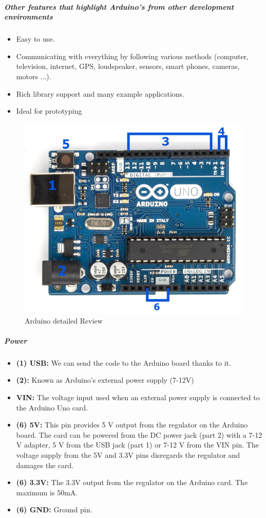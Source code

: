 \documentclass[11pt]{article}
\begin{document}
\vspace{0.1cm}
\subparagraph*{Other features that highlight Arduino’s from other development environments}
\begin{itemize}
\item Easy to use.
\item Communicating with everything by following various methods (computer, television, internet, GPS, loudspeaker, sensors, smart phones, cameras, motors ...).
\item Rich library support and many example applications.
\item Ideal for prototyping
\end{itemize}

\pagebreak

\begin{figure}[h]
\centering
\includegraphics[scale=0.25]{arduinoreview.png}
\caption{Arduino detailed Review}
\end{figure}

\subparagraph*{Power}
\begin{itemize}
\item[] \textbf{(1) USB:} We can send the code to the Arduino board thanks to it.
\item[] \textbf{(2):} Known as Arduino’s external power supply (7-12V)
\item[] \textbf{VIN:} The voltage input used when an external power supply is connected to the Arduino Uno card.
\item[] \textbf{(6) 5V:} This pin provides 5 V output from the regulator on the Arduino board. The card can be powered from the DC
power jack (part 2) with a 7-12 V adapter, 5 V from the USB jack (part 1) or 7-12 V from the VIN pin. The voltage supply from the 5V and 3.3V pins disregards the regulator and damages the card.
\item[] \textbf{(6) 3.3V:} The 3.3V output from the regulator on the Arduino card. The maximum is 50mA.
\item[] \textbf{(6) GND:} Ground pin.
\end{itemize}
\end{document}
